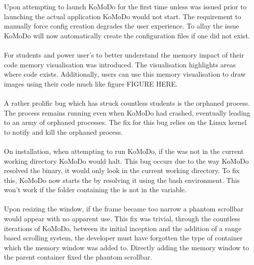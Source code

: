   Upon attempting to launch KoMoDo for the first time unless  was issued prior to launching the actual application KoMoDo would not start. The requirement to manually force config creation degrades the user experience. To allay the issue KoMoDo will now automatically create the configuration files if one did not exist.\\\\
  For students and power user's to better understand the memory impact of their code memory visualisation was introduced. The visualisation highlights areas where code exists. Additionally, users can use this memory visualisation to draw images using their code much like figure FIGURE HERE.\\\\
  A rather prolific bug which has struck countless students is the orphaned  process. The process remains running even when KoMoDo had crashed, eventually leading to an army of orphaned processes. The fix for this bug relies on the Linux kernel to notify and kill the orphaned process.\\\\
  On installation, when attempting to run KoMoDo, if the  was not in the current working directory KoMoDo would halt. This bug occurs due to the way KoMoDo resolved the  binary, it would only look in the current working directory. To fix this, KoMoDo now starts the  by resolving it using the bash environment. This won't work if the folder containing the  is not in the  variable.\\\\
  Upon resizing the window, if the frame became too narrow a phantom scrollbar would appear with no apparent use. This fix was trivial, through the countless iterations of KoMoDo, between its initial inception and the addition of a range based scrolling system, the developer must have forgotten the type of container which the memory window was added to. Directly adding the memory window to the parent container fixed the phantom scrollbar.\\\\
